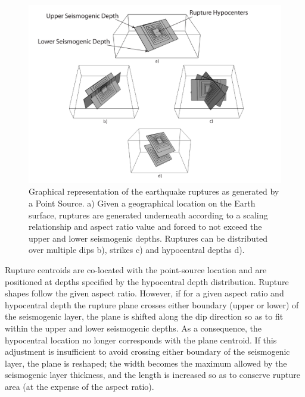\begin{figure}
\centering
\includegraphics[width=14cm]{./Pictures/PointSource.pdf}
\caption{Graphical representation of the earthquake ruptures as generated by a Point Source. a) Given a geographical location on the Earth surface, ruptures are generated underneath according to a scaling relationship and aspect ratio value and forced to not exceed the upper and lower seismogenic depths. Ruptures can be distributed over multiple dips b), strikes c) and hypocentral depths d).}
\label{fig:PointSource}
\end{figure}
Rupture centroids are co-located with the point-source location and are positioned at depths specified by the hypocentral depth distribution. Rupture shapes follow the given aspect ratio. However, if for a given aspect ratio and hypocentral depth the rupture plane crosses either boundary (upper or lower) of the seismogenic layer, the plane is shifted along the dip direction so as to fit within the upper and lower seismogenic depths. As a consequence, the hypocentral location no longer corresponds with the plane centroid. If this adjustment is insufficient to avoid crossing either boundary of the seismogenic layer, the plane is reshaped; the width becomes the maximum allowed by the seismogenic layer thickness, and the length is increased so as to conserve rupture area (at the expense of the aspect ratio).

